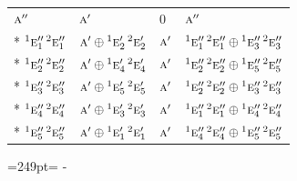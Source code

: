 \documentclass[10pt,a4paper]{article}
\newcommand{\needspace}[1]{\par\penalty-100\begingroup\dimen0=#1\relax\dimen2=\pagegoal
  \advance\dimen2-\pagetotal\ifdim\dimen0>\dimen2\relax\ifdim\dimen2>0pt\vfil\break\fi\fi
  \endgroup}
\numberwithin{equation}{section}
\newcommand{\irr}[1]{\text{\normalfont\scshape #1}}
\newcommand{\conjpair}[1]{{}^{#1}}
\begin{document}
{\begin{longtable}{@{}llll@{}}
$\irr{a}''$ & $\irr{a}'$ & $0$ & $\irr{a}''$\\*
$\conjpair{1}\irr{e}_{1}''\,\conjpair{2}\irr{e}_{1}''$ & $\irr{a}' \oplus \conjpair{1}\irr{e}_{2}'\,\conjpair{2}\irr{e}_{2}'$ & $\irr{a}'$ & $\conjpair{1}\irr{e}_{1}''\,\conjpair{2}\irr{e}_{1}'' \oplus \conjpair{1}\irr{e}_{3}''\,\conjpair{2}\irr{e}_{3}''$\\*
$\conjpair{1}\irr{e}_{2}''\,\conjpair{2}\irr{e}_{2}''$ & $\irr{a}' \oplus \conjpair{1}\irr{e}_{4}'\,\conjpair{2}\irr{e}_{4}'$ & $\irr{a}'$ & $\conjpair{1}\irr{e}_{2}''\,\conjpair{2}\irr{e}_{2}'' \oplus \conjpair{1}\irr{e}_{5}''\,\conjpair{2}\irr{e}_{5}''$\\*
$\conjpair{1}\irr{e}_{3}''\,\conjpair{2}\irr{e}_{3}''$ & $\irr{a}' \oplus \conjpair{1}\irr{e}_{5}'\,\conjpair{2}\irr{e}_{5}'$ & $\irr{a}'$ & $\conjpair{1}\irr{e}_{2}''\,\conjpair{2}\irr{e}_{2}'' \oplus \conjpair{1}\irr{e}_{3}''\,\conjpair{2}\irr{e}_{3}''$\\*
$\conjpair{1}\irr{e}_{4}''\,\conjpair{2}\irr{e}_{4}''$ & $\irr{a}' \oplus \conjpair{1}\irr{e}_{3}'\,\conjpair{2}\irr{e}_{3}'$ & $\irr{a}'$ & $\conjpair{1}\irr{e}_{1}''\,\conjpair{2}\irr{e}_{1}'' \oplus \conjpair{1}\irr{e}_{4}''\,\conjpair{2}\irr{e}_{4}''$\\*
$\conjpair{1}\irr{e}_{5}''\,\conjpair{2}\irr{e}_{5}''$ & $\irr{a}' \oplus \conjpair{1}\irr{e}_{1}'\,\conjpair{2}\irr{e}_{1}'$ & $\irr{a}'$ & $\conjpair{1}\irr{e}_{4}''\,\conjpair{2}\irr{e}_{4}'' \oplus \conjpair{1}\irr{e}_{5}''\,\conjpair{2}\irr{e}_{5}''$\\
\bottomrule\end{longtable}}
\needspace{249pt}
\end{document}
